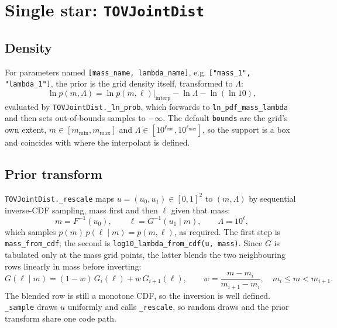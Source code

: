 \documentclass[11pt,a4paper]{article}
\newcommand{\code}[1]{\texttt{#1}}
\begin{document}
\section{Single star: \code{TOVJointDist}}
\label{sec:single}

\subsection{Density}

For parameters named \code{[mass\_name, lambda\_name]}, e.g.
\code{["mass\_1", "lambda\_1"]}, the prior is the grid density itself,
transformed to $\Lambda$:
\begin{equation}
  \ln p(m, \Lambda) = \ln p(m, \ell)\big|_{\text{interp}} - \ln\Lambda - \ln(\ln 10),
  \label{eq:single}
\end{equation}
evaluated by \code{TOVJointDist.\_ln\_prob}, which forwards to
\code{ln\_pdf\_mass\_lambda} and then sets out-of-bounds samples to $-\infty$.
The default \code{bounds} are the grid's own extent,
$m \in [m_{\min}, m_{\max}]$ and $\Lambda \in [10^{\ell_{\min}}, 10^{\ell_{\max}}]$,
so the support is a box and coincides with where the interpolant is defined.

\subsection{Prior transform}
\label{sec:single_rescale}

\code{TOVJointDist.\_rescale} maps $u = (u_0, u_1) \in [0,1]^2$ to $(m, \Lambda)$
by sequential inverse-CDF sampling, mass first and then $\ell$ given that mass:
\begin{equation}
  m = F^{-1}(u_0),
  \qquad
  \ell = G^{-1}(u_1 \mid m),
  \qquad
  \Lambda = 10^{\ell} ,
  \label{eq:single_rescale}
\end{equation}
which samples $p(m)\,p(\ell \mid m) = p(m, \ell)$, as required. The first step is
\code{mass\_from\_cdf}; the second is
\code{log10\_lambda\_from\_cdf(u, mass)}. Since $G$ is tabulated only at the mass
grid points, the latter blends the two neighbouring rows linearly in mass
before inverting:
\begin{equation}
  G(\ell \mid m) = (1-w)\, G_{i}(\ell) + w\, G_{i+1}(\ell),
  \qquad
  w = \frac{m - m_i}{m_{i+1} - m_i}, \quad m_i \le m < m_{i+1}.
  \label{eq:rowblend}
\end{equation}
The blended row is still a monotone CDF, so the inversion is well defined.
\code{\_sample} draws $u$ uniformly and calls \code{\_rescale}, so random draws
and the prior transform share one code path.
\end{document}
